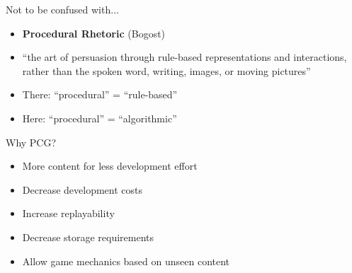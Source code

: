 \begin{frame}{Not to be confused with...}
	\begin{itemize}
		\pause\item \textbf{Procedural Rhetoric} (Bogost)
		\pause\item ``the art of persuasion through rule-based representations and interactions,
			rather than the spoken word, writing, images, or moving pictures''
		\pause\item There: ``procedural'' = ``rule-based''
		\pause\item Here: ``procedural'' = ``algorithmic''
	\end{itemize}
\end{frame}

\begin{frame}{Why PCG?}
	\begin{itemize}
		\pause\item More content for less development effort
		\pause\item Decrease development costs
		\pause\item Increase replayability
		\pause\item Decrease storage requirements
		\pause\item Allow game mechanics based on unseen content
	\end{itemize}
\end{frame}

